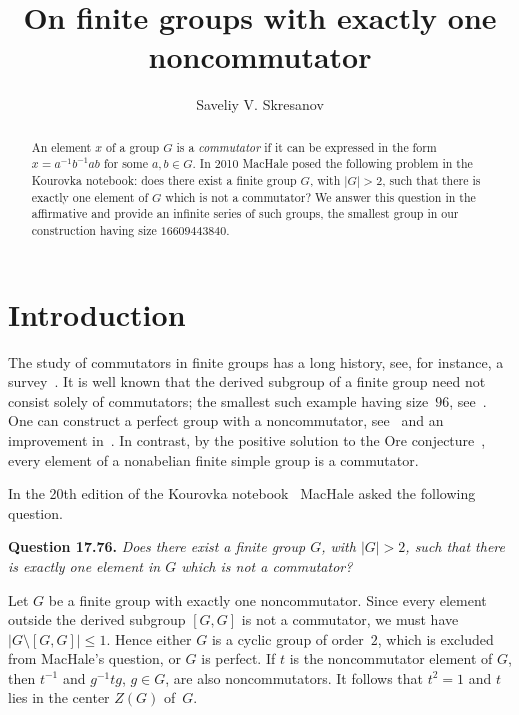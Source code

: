 \documentclass{article}
\title{On finite groups with exactly one noncommutator}
\author{Saveliy V. Skresanov}
\date{}
\begin{document}
\maketitle

\begin{abstract}
	An element $x$ of a group $G$ is a \emph{commutator} if it can be expressed in the form $x = a^{-1}b^{-1}ab$
	for some $a, b \in G$. In 2010 MacHale posed the following problem in the Kourovka notebook: does there exist
	a finite group $G$, with $|G| > 2$, such that there is exactly one element of $G$ which is not a commutator?
	We answer this question in the affirmative and provide an infinite series of such groups, the smallest group
	in our construction having size $16609443840$.
\end{abstract}


\section{Introduction}

The study of commutators in finite groups has a long history, see, for instance, a survey~\cite{kappe}.
It is well known that the derived subgroup of a finite group need not consist solely of commutators;
the smallest such example having size~\( 96 \), see~\cite{gural}. One can construct a perfect group with a noncommutator,
see~\cite{isaacs} and an improvement in~\cite{gural2}. In contrast, by the positive solution to the Ore conjecture~\cite{ore},
every element of a nonabelian finite simple group is a commutator.

In the 20th edition of the Kourovka notebook~\cite{kourovka} MacHale asked the following question.
\medskip

\noindent
\textbf{Question 17.76.} \emph{Does there exist a finite group \( G \), with \( |G| > 2 \),
such that there is exactly one element in \( G \) which is not a commutator?}
\medskip

Let \( G \) be a finite group with exactly one noncommutator. Since every element outside the derived subgroup \( [G, G] \)
is not a commutator, we must have \( |G \setminus [G,G]| \leq 1 \). Hence either \( G \) is a cyclic group of order~\( 2 \),
which is excluded from MacHale's question, or \( G \) is perfect. If \( t \) is the noncommutator element of \( G \),
then \( t^{-1} \) and \( g^{-1}tg \), \( g \in G \), are also noncommutators. It follows that \( t^2 = 1 \) and \( t \)
lies in the center \( Z(G) \) of~\( G \).
\end{document}
